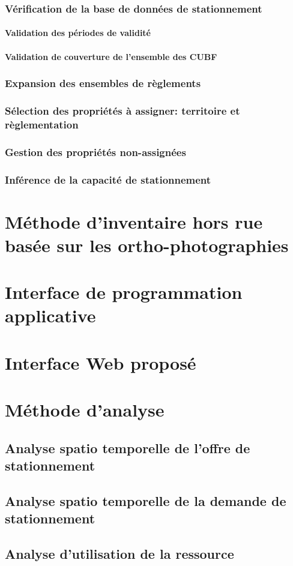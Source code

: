         \subsubsection{Vérification de la base de données de stationnement}
            \paragraph{Validation des périodes de validité}
            \paragraph{Validation de couverture de l'ensemble des \ac{CUBF}}
        \subsubsection{Expansion des ensembles de règlements}
        \subsubsection{Sélection des propriétés à assigner: territoire et règlementation}
        \subsubsection{Gestion des propriétés non-assignées}
        \subsubsection{Inférence de la capacité de stationnement}
     
\section{Méthode d'inventaire hors rue basée sur les ortho-photographies}\label{sec:meth_orthophoto}
\section{Interface de programmation applicative}\label{sec:meth_API}
\section{Interface Web proposé} \label{sec:meth_interface_web}
\section{Méthode d'analyse} \label{sec:meth_analyse}
  \subsection{Analyse spatio temporelle de l'offre de stationnement}
  \subsection{Analyse spatio temporelle de la demande de stationnement}
  \subsection{Analyse d'utilisation de la ressource}
